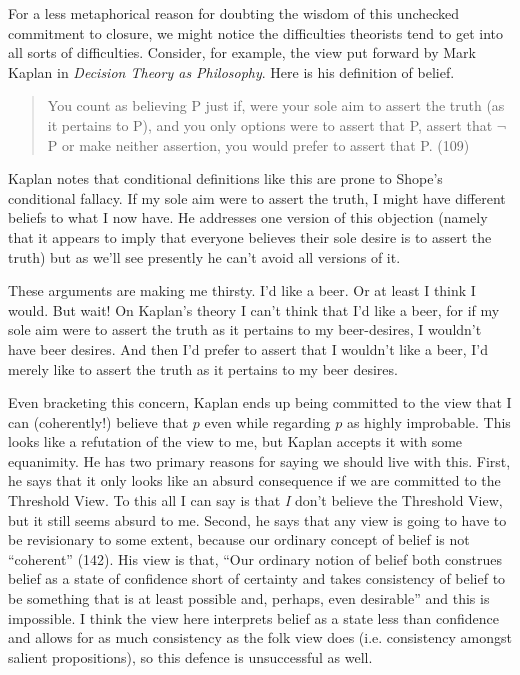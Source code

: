 For a less metaphorical reason for doubting the wisdom of this unchecked commitment to closure, we might notice the difficulties theorists tend to get into all sorts of difficulties. Consider, for example, the view put forward by Mark Kaplan in \textit{Decision Theory as Philosophy}. Here is his definition of belief.

\begin{quote}
You count as believing P just if, were your sole aim to assert the truth (as it pertains to P), and you only options were to assert that P, assert that \(\neg\)P or make neither assertion, you would prefer to assert that P. (109)
\end{quote}

\noindent Kaplan notes that conditional definitions like this are prone to Shope's conditional fallacy. If my sole aim were to assert the truth, I might have different beliefs to what I now have. He addresses one version of this objection (namely that it appears to imply that everyone believes their sole desire is to assert the truth) but as we'll see presently he can't avoid all versions of it.

These arguments are making me thirsty. I'd like a beer. Or at least I think I would. But wait! On Kaplan's theory I can't think that I'd like a beer, for if my sole aim were to assert the truth as it pertains to my beer-desires, I wouldn't have beer desires. And then I'd prefer to assert that I wouldn't like a beer, I'd merely like to assert the truth as it pertains to my beer desires. 

Even bracketing this concern, Kaplan ends up being committed to the view that I can (coherently!) believe that \(p\) even while regarding \(p\) as highly improbable. This looks like a refutation of the view to me, but Kaplan accepts it with some equanimity. He has two primary reasons for saying we should live with this. First, he says that it only looks like an absurd consequence if we are committed to the Threshold View. To this all I can say is that \textit{I} don't believe the Threshold View, but it still seems absurd to me. Second, he says that any view is going to have to be revisionary to some extent, because our ordinary concept of belief is not ``coherent'' (142). His view is that, ``Our ordinary notion of belief both construes belief as a state of confidence short of certainty and takes consistency of belief to be something that is at least possible and, perhaps, even desirable'' and this is impossible. I think the view here interprets belief as a state less than confidence and allows for as much consistency as the folk view does (i.e. consistency amongst salient propositions), so this defence is unsuccessful as well.

